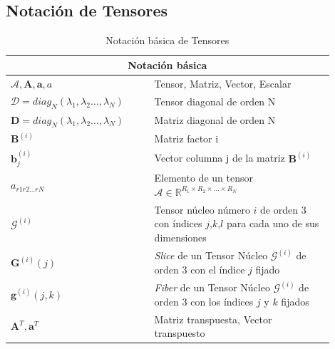 \documentclass[spanish]{article}
\theoremstyle{definition}
\theoremstyle{remark}
\numberwithin{equation}{section}
\numberwithin{equation}{section} %
\begin{document}
\subsection{Notación de Tensores}
 \FloatBarrier
\begin{table}[hbt!]
\centering
\begin{tabular}{p{0.4\linewidth}p{0.5\linewidth}}
\hline
\multicolumn{2}{c}{\large  Notación básica } \\
\hline 
 \large $\mathcal{A}, \textbf{A}, \textbf{a}, a$  & 
 \large Tensor, Matriz, Vector, Escalar \\ 
 
  \large $\mathcal{D}= diag_N(\lambda_1,\lambda_2 \ldots,\lambda_N)$  & 
 \large Tensor diagonal de orden N \\ 
 
   \large $\textbf{D}= diag_N(\lambda_1,\lambda_2\ldots,\lambda_N)$  & 
 \large Matriz diagonal de orden N \\ 
 
\large $\textbf{B}^{(i)}$ & 
\large Matriz factor i \\

\large $\textbf{b}^{(i)}_{j}$ & 
\large Vector columna j de la matriz
 $\textbf{B}^{(i)}$\\

 \large $a_{r1r2 \ldots rN}$&
 \large Elemento de un  tensor $\mathcal{A} \in \mathbb{R} ^{R_1 \times R_2 \times \ldots \times R_N}$\\
 
\large $\mathcal{G}^{(i)}$ & 
\large Tensor núcleo número $i$ de orden 3 con índices $j$,$k$,$l$ para cada uno de sus dimensiones \\

\large $\textbf{G}^{(i)}(j)$ &
\large \textit{Slice} de un Tensor Núcleo $\mathcal{G}^{(i)}$ de orden 3 con el índice $j$ fijado \\
\large $\textbf{g}^{(i)}(j,k)$ & 
\large \textit{Fiber} de un Tensor Núcleo $\mathcal{G}^{(i)}$ de orden 3 con los índices $j$ y $k$ fijados \\
\large  $\textbf{A}^{T}, \textbf{a}^{T}$ &
\large   Matriz transpuesta, Vector transpuesto\\
 

\hline\hline 
\end{tabular}
\label{table:NotacionBasica}
\caption{Notación básica de Tensores}
\end{table}
 \FloatBarrier
\end{document}
